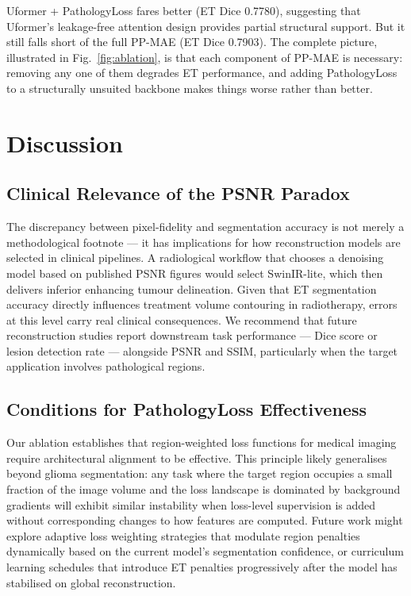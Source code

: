 \documentclass[conference]{IEEEtran}
\begin{document}
Uformer + PathologyLoss fares better (ET Dice 0.7780), suggesting
that Uformer's leakage-free attention design provides partial
structural support. But it still falls short of the full PP-MAE
(ET Dice 0.7903). The complete picture, illustrated in
Fig.~\ref{fig:ablation}, is that each component of PP-MAE is
necessary: removing any one of them degrades ET performance, and
adding PathologyLoss to a structurally unsuited backbone makes
things worse rather than better.

\section{Discussion}

\subsection{Clinical Relevance of the PSNR Paradox}

The discrepancy between pixel-fidelity and segmentation accuracy
is not merely a methodological footnote — it has implications for
how reconstruction models are selected in clinical pipelines. A
radiological workflow that chooses a denoising model based on
published PSNR figures would select SwinIR-lite, which then
delivers inferior enhancing tumour delineation. Given that ET
segmentation accuracy directly influences treatment volume
contouring in radiotherapy, errors at this level carry real
clinical consequences. We recommend that future reconstruction
studies report downstream task performance — Dice score or
lesion detection rate — alongside PSNR and SSIM, particularly
when the target application involves pathological regions.

\subsection{Conditions for PathologyLoss Effectiveness}

Our ablation establishes that region-weighted loss functions for
medical imaging require architectural alignment to be effective.
This principle likely generalises beyond glioma segmentation:
any task where the target region occupies a small fraction of
the image volume and the loss landscape is dominated by background
gradients will exhibit similar instability when loss-level
supervision is added without corresponding changes to how features
are computed. Future work might explore adaptive loss weighting
strategies that modulate region penalties dynamically based on
the current model's segmentation confidence, or curriculum
learning schedules that introduce ET penalties progressively
after the model has stabilised on global reconstruction.
\end{document}
